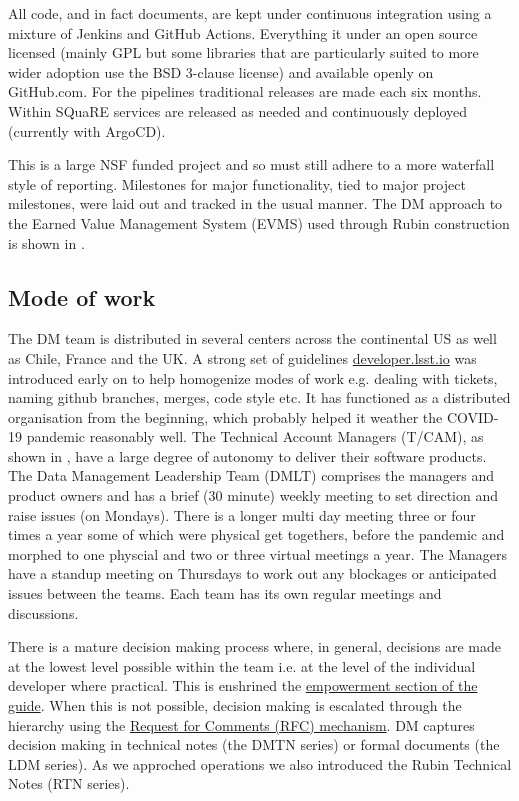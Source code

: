 All code, and in fact documents, are kept under continuous integration using a mixture of Jenkins and GitHub Actions.
Everything it under an open source licensed (mainly GPL but some libraries that are particularly suited to more wider adoption use the BSD 3-clause license) and available openly on GitHub.com.
For the pipelines traditional releases are made each six months.
Within SQuaRE services are released as needed and continuously deployed (currently with ArgoCD).

This is a large NSF funded project and so must still adhere to a more waterfall style of reporting.
Milestones for major functionality, tied to major project milestones, were laid out and tracked in the usual manner.
The DM approach to the Earned Value Management System (EVMS) used through Rubin construction is shown in \citet{DMTN-020,2016SPIE.9911E..0NK}.

\subsection{Mode of work}\label{sec:mode}
The DM  team is distributed in several centers across the continental US as well as Chile, France and the UK.
A strong set of guidelines \href{https:\\developer.lsst.io}{developer.lsst.io} was introduced early on to help homogenize modes of work e.g. dealing with tickets, naming github branches, merges, code style etc.
It has functioned as a distributed organisation from the beginning, which probably helped it weather the COVID-19 pandemic reasonably well.
The Technical Account Managers (T/CAM), as shown in , have a large degree of autonomy to deliver their software products.
The Data Management Leadership Team (DMLT) comprises the managers and product owners and has a brief (30 minute) weekly meeting to set direction and raise issues (on Mondays).
There is a longer multi day meeting three or four times a year some of which were physical get togethers, before the pandemic and morphed to one physcial and two or three virtual meetings a year.
The Managers have a standup meeting on Thursdays to work out any blockages or anticipated issues between the teams.
Each team has its own regular meetings and discussions.

There is a mature decision making process where, in general, decisions are made at the lowest level possible within the team i.e. at the level of the individual developer where practical. This is enshrined the \href{https://developer.lsst.io/team/empowerment.html}{empowerment section of the guide}.
When this is not possible, decision making is escalated through the hierarchy using  the \href{https://developer.lsst.io/communications/rfc.html}{Request for Comments (RFC) mechanism}.
DM captures decision making in technical notes (the DMTN series) or formal documents (the LDM series).
As we approched operations we also introduced the Rubin Technical Notes (RTN series).


